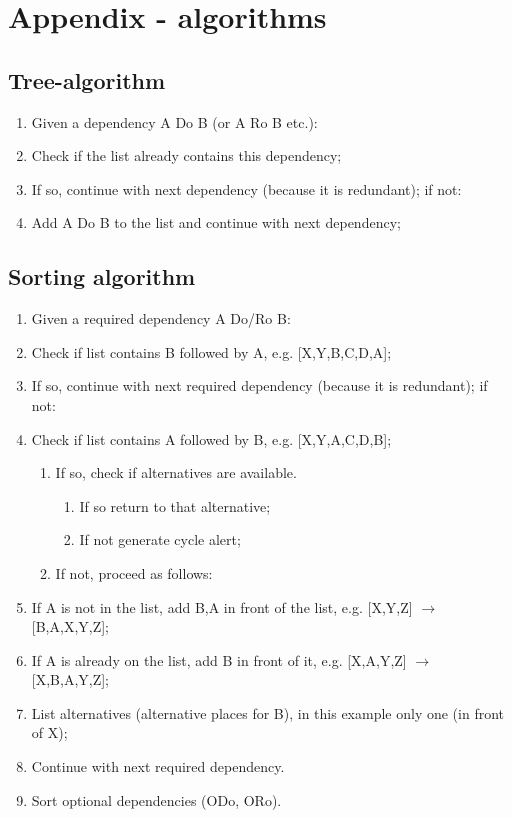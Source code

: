 \newpage

\section{Appendix - algorithms}\label{sec:appendix}

\subsection{Tree-algorithm}\label{sec:tree}
  \begin{enumerate}
     \item Given a dependency A Do B (or A Ro B etc.):
     \item Check if the list already contains this dependency;
     \item If so, continue with next dependency (because it is redundant); if not:
     \item Add A Do B to the list and continue with next dependency;
    \end{enumerate}

\subsection{Sorting algorithm}\label{sec:sort}
    \begin{enumerate}
     \item Given a required dependency A Do/Ro B:
     \item Check if list contains B followed by A, e.g. [X,Y,B,C,D,A];
     \item If so, continue with next required dependency (because it is redundant); if not:
     \item Check if list contains A followed by B, e.g. [X,Y,A,C,D,B];
      \begin{enumerate}
       \item If so, check if alternatives are available. 
        \begin{enumerate}
         \item If so return to that alternative; 
         \item If not generate cycle alert;
        \end{enumerate}
        \item If not, proceed as follows:
      \end{enumerate}
     \item If A is not in the list, add B,A in front of the list, e.g. [X,Y,Z] \begin{math} \rightarrow \end{math} [B,A,X,Y,Z];
     \item If A is already on the list, add B in front of it, e.g. [X,A,Y,Z] \begin{math} \rightarrow \end{math} [X,B,A,Y,Z];
     \item List alternatives (alternative places for B), in this example only one (in front of X); 
     \item Continue with next required dependency.
     \item Sort optional dependencies (ODo, ORo).
    \end{enumerate}